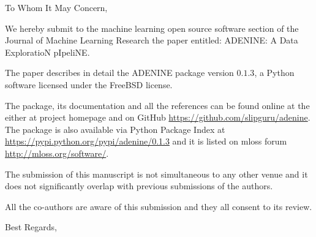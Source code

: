 \documentclass[a4paper]{letter}
\begin{document}
\begin{letter}{}


\opening{To Whom It May Concern,}
We hereby submit to the machine learning open source software section of the Journal of Machine Learning Research the paper entitled: {\sc ADENINE: A Data ExploratioN pIpeliNE}.

The paper describes in detail the {\sc ADENINE} package version $0.1.3$, a Python software licensed under the FreeBSD license.

The package, its documentation and all the references can be found online at the either at project homepage  and on GitHub \url{https://github.com/slipguru/adenine}. The package is also available via Python Package Index at \url{https://pypi.python.org/pypi/adenine/0.1.3} and it is listed on mloss forum \url{http://mloss.org/software/}.

The submission of this manuscript is not simultaneous to any other venue and it does not significantly overlap with previous submissions of the authors.

All the co-authors are aware of this submission and they all consent to its review.


\closing{Best Regards,}
\end{letter}
\end{document}
